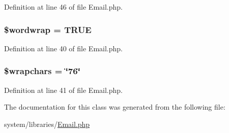 Definition at line 46 of file Email.\-php.

\hypertarget{class_c_i___email_abc150a71df67310da874f7399ab5f2cd}{
\subsubsection[{\$wordwrap}]{\setlength{\rightskip}{0pt plus 5cm}\$wordwrap = T\-R\-U\-E}}\label{class_c_i___email_abc150a71df67310da874f7399ab5f2cd}


Definition at line 40 of file Email.\-php.

\hypertarget{class_c_i___email_a8834e27a87a8b935ab1155d1d7bd44d2}{
\subsubsection[{\$wrapchars}]{\setlength{\rightskip}{0pt plus 5cm}\$wrapchars = \char`\"{}76\char`\"{}}}\label{class_c_i___email_a8834e27a87a8b935ab1155d1d7bd44d2}


Definition at line 41 of file Email.\-php.



The documentation for this class was generated from the following file\-:\begin{DoxyCompactItemize}
\item 
system/libraries/\hyperlink{_email_8php}{Email.\-php}\end{DoxyCompactItemize}

